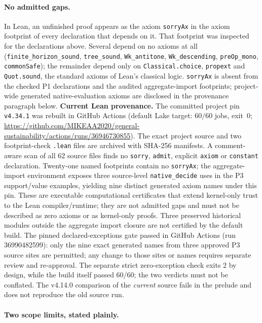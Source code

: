 \documentclass[10pt,twocolumn]{article}
\theoremstyle{definition}
\begin{document}
\paragraph{No admitted gaps.} In Lean, an unfinished proof appears as the axiom
\texttt{sorryAx} in the axiom footprint of every declaration that depends on it. That
footprint was inspected for the declarations above. Several depend on no axioms at all
(\texttt{finite\_horizon\_sound}, \texttt{tree\_sound}, \texttt{Wk\_antitone},
\texttt{Wk\_descending}, \texttt{preOp\_mono}, \texttt{commonSafe}); the remainder depend
only on \texttt{Classical.choice}, \texttt{propext} and \texttt{Quot.sound}, the standard
axioms of Lean's classical logic. \texttt{sorryAx} is absent from the checked P1 declarations and the audited aggregate-import footprints; project-wide generated native-evaluation axioms are disclosed in the provenance paragraph below.
\noindent\textbf{Current Lean provenance.} The committed project pin \texttt{v4.34.1} was rebuilt in GitHub Actions (default Lake target: \(60/60\) jobs, exit~0; \url{https://github.com/MIKEAA2020/general-sustainability/actions/runs/36946730855}). The exact project source and two footprint-check \texttt{.lean} files are archived with SHA-256 manifests. A comment-aware scan of all \(62\) source files finds no \texttt{sorry}, \texttt{admit}, explicit \texttt{axiom} or \texttt{constant} declaration. Twenty-one named footprints contain no \texttt{sorryAx}; the aggregate-import environment exposes three source-level \texttt{native\_decide} uses in the P3 support/value examples, yielding nine distinct generated axiom names under this pin. These are executable computational certificates that extend kernel-only trust to the Lean compiler/runtime; they are not admitted gaps and must not be described as zero axioms or as kernel-only proofs. Three preserved historical modules outside the aggregate import closure are not certified by the default build. The pinned declared-exceptions gate passed in GitHub Actions (run 36990482599): only the nine exact generated names from three approved P3 source sites are permitted; any change to those sites or names requires separate review and re-approval. The separate strict zero-exception check exits 2 by design, while the build itself passed 60/60; the two verdicts must not be conflated. The v4.14.0 comparison of the \emph{current} source fails in the prelude and does not reproduce the old source run.

\paragraph{Two scope limits, stated plainly.}
\end{document}
